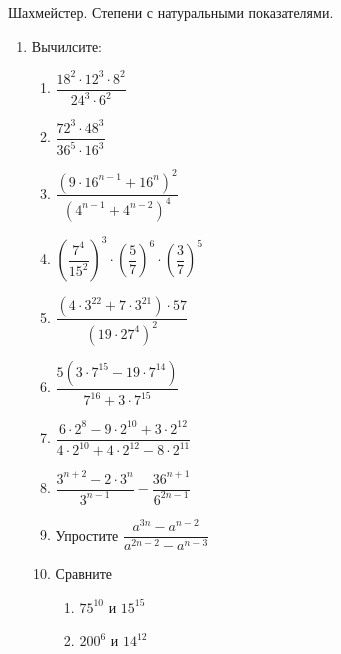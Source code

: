\documentclass[12pt, a4paper]{article}
\begin{document}
	
	Шахмейстер. Степени с натуральными показателями.
\begin{enumerate}
	\item Вычилсите:
		\begin{enumerate}[label=\textbf{\arabic*)}]
			\item \( \dfrac{18^2\cdot12^3\cdot8^2}{24^3\cdot6^2} \)
			\item \( \dfrac{72^3\cdot48^3}{36^5\cdot16^3} \) 
			\item \( \dfrac{(9\cdot16^{n-1}+16^n)^2}{(4^{n-1}+4^{n-2})^4} \)
			\item \( \left( \dfrac{7^4}{15^2} \right)^3\cdot\left( \dfrac{5}{7} \right)^6\cdot\left( \dfrac{3}{7} \right)^5 \)
			\item \( \dfrac{(4\cdot3^{22}+7\cdot3^{21})\cdot57}{(19\cdot27^4)^2} \)
			\item \( \dfrac{5(3\cdot7^{15}-19\cdot7^{14})}{7^{16}+3\cdot7^{15}} \)
			\item \( \dfrac{6\cdot2^8-9\cdot2^{10}+3\cdot2^{12}}{4\cdot2^{10}+4\cdot2^{12}-8\cdot2^{11}} \)
			\item \( \dfrac{3^{n+2}-2\cdot3^n}{3^{n-1}}-\dfrac{36^{n+1}}{6^{2n-1}} \)
			\item Упростите \( \dfrac{a^{3n}-a^{n-2}}{a^{2n-2}-a^{n-3}} \)
			\item Сравните 
			\begin{enumerate}[label=\textbf{\asbuk*)}]
				\item \( 75^{10} \) и \( 15^{15} \)
				\item \( 200^6 \) и \( 14^{12} \)
			\end{enumerate}
		\end{enumerate}
\end{enumerate}
\end{document}

